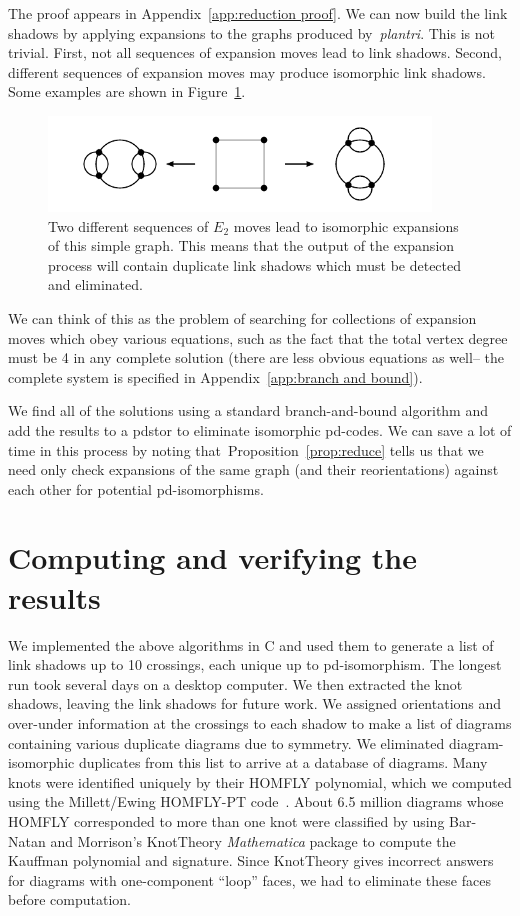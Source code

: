 \documentclass[amsmath,secnumarabic,amssymb,floatfix,nofootinbib,nobibnotes,letterpaper,11pt,tightenlines,showkeys]{revtex4}
\theoremstyle{definition}
\newcommand{\edgedouble}{E_2}
\let\mgp=\marginpar \marginparwidth18mm \marginparsep1mm
\def\marginpar#1{\mgp{\raggedright\tiny #1}}
\let\lbl=\label
\def\label#1{\lbl{#1}\ifinner\else\marginpar{\ref{#1} #1}\ignorespaces\fi}
\begin{document}
The proof appears in Appendix~\ref{app:reduction proof}. We can now build the link shadows by applying expansions to the graphs produced by~\emph{plantri}. This is not trivial. First, not all sequences of expansion moves lead to link shadows. Second,
different sequences of expansion moves may produce isomorphic link shadows. Some examples are shown in
Figure~\ref{fig:expansion woes}.
\begin{figure}[H]
\begin{center}
\includegraphics[width=4in]{isomorphic-expansions.pdf}
\end{center}
\caption{Two different sequences of $\edgedouble$ moves lead to isomorphic expansions of this simple graph. This means that the output of the expansion process will contain duplicate link shadows which must be detected and eliminated.}
\label{fig:expansion woes}
\end{figure}

We can think of this as the problem of searching for collections of expansion moves which obey various equations, such as the fact that the total vertex degree must be 4 in any complete solution (there are less obvious equations as well-- the complete system is specified in Appendix~\ref{app:branch and bound}).

We find all of the solutions using a standard branch-and-bound algorithm and add the results to a pdstor to eliminate isomorphic pd-codes. We can save a lot of time in this process by noting that~Proposition~\ref{prop:reduce} tells us that we need only check expansions of the same graph (and their reorientations) against each other for potential pd-isomorphisms.

\section{Computing and verifying the results}

We implemented the above algorithms in C and used them to generate a list of link shadows up to 10 crossings, each unique up to pd-isomorphism. The longest run took several days on a desktop computer. We then extracted the knot shadows, leaving the link shadows for future work. We assigned orientations and over-under information at the crossings to each shadow to make a list of diagrams containing various duplicate diagrams due to symmetry. We eliminated diagram-isomorphic duplicates from this list to arrive at a database of diagrams. Many knots were identified uniquely by their HOMFLY polynomial, which we computed using the Millett/Ewing HOMFLY-PT code~\cite{MR98k:57010}. About 6.5 million diagrams whose HOMFLY corresponded to more than one knot were classified by using Bar-Natan and Morrison's KnotTheory \emph{Mathematica} package to compute the Kauffman polynomial and signature. Since KnotTheory gives incorrect answers for diagrams with one-component ``loop'' faces, we had to eliminate these faces before computation.
\end{document}
